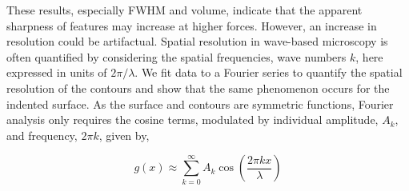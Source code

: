 These results, especially  FWHM and volume, indicate that the apparent sharpness of features may increase at higher forces. However, an increase in resolution could be artifactual\cite{morigaki1998analysis}. Spatial resolution in wave-based microscopy is often quantified by considering the spatial frequencies\cite{novotny1998implications,tolan1998evidence,slough1990atomic, morigaki1998analysis}, wave numbers $k$, here expressed in units of $2\pi/\lambda$. We fit data to a Fourier series to quantify the spatial resolution of the contours and show that the same phenomenon occurs for the indented surface. As the surface and contours are symmetric functions, Fourier analysis only requires the cosine terms, modulated by individual amplitude, $A_k$, and frequency, $2\pi k$, given by, 

\begin{equation}
    g(x) \approx \sum^{\infty}_{k=0} A_{k} \cos\left( \frac{2\pi k x}{\lambda}\right)
\end{equation}

